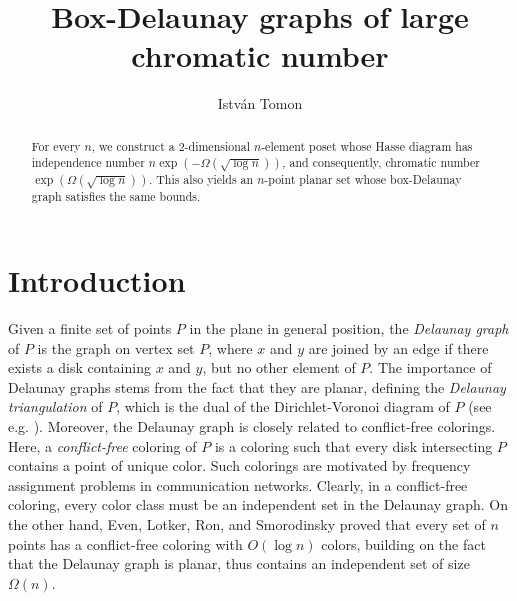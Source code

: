 \documentclass[11pt]{article}
\title{Box-Delaunay graphs of large chromatic number}
\author{Istv\'an Tomon}
\affil{Ume\r{a} University}
\affil{\texttt{istvan.tomon@umu.se}}
\date{}
\theoremstyle{definition}
\begin{document}
\maketitle
\sloppy

\begin{abstract}
   For every $n$, we construct a 2-dimensional $n$-element poset whose Hasse diagram has independence number $n\exp(-\Omega(\sqrt{\log n}))$, and consequently, chromatic number $\exp(\Omega(\sqrt{\log n}))$. This also yields an $n$-point planar set whose box-Delaunay graph satisfies the same bounds.
\end{abstract}

\section{Introduction}
Given a finite set of points $P$ in the plane in general position, the \emph{Delaunay graph} of $P$ is the graph on vertex set $P$, where $x$ and $y$ are joined by an edge if there exists a disk containing $x$ and $y$, but no other element of $P$. The importance of Delaunay graphs stems from the fact that they are planar, defining the \emph{Delaunay triangulation} of $P$, which is the dual of the Dirichlet-Voronoi diagram of $P$ (see e.g. \cite{BKOS}). Moreover, the Delaunay graph is closely related to conflict-free colorings. Here, a \emph{conflict-free} coloring of $P$ is a coloring such that every disk intersecting $P$ contains a point of unique color. Such colorings are motivated by frequency assignment problems in communication networks. Clearly, in a conflict-free coloring, every color class must be an independent set in the Delaunay graph. On the other hand, Even, Lotker, Ron, and Smorodinsky \cite{ELRS} proved that every set of $n$ points has a conflict-free coloring with $O(\log n)$ colors, building on the fact that the Delaunay graph is planar, thus contains an independent set of size $\Omega(n)$. 
\end{document}
